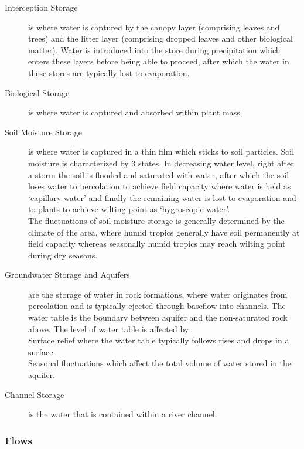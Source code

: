 \documentclass[../../main]{subfiles}
\begin{document}
	\begin{description}
		\item[Interception Storage] is where water is captured by the canopy layer (comprising leaves and trees) and the litter layer (comprising dropped leaves and other biological matter). Water is introduced into the store during precipitation which enters these layers before being able to proceed, after which the water in these stores are typically lost to evaporation.
		\item[Biological Storage] is where water is captured and absorbed within plant mass.
		\item[Soil Moisture Storage] is where water is captured in a thin film which sticks to soil particles. Soil moisture is characterized by 3 states. In decreasing water level, right after a storm the soil is flooded and saturated with water, after which the soil loses water to percolation to achieve field capacity where water is held as `capillary water' and finally the remaining water is lost to evaporation and to plants to achieve wilting point as `hygroscopic water'. \\
		The fluctuations of soil moisture storage is generally determined by the climate of the area, where humid tropics generally have soil permanently at field capacity whereas seasonally humid tropics may reach wilting point during dry seasons.
		\item[Groundwater Storage and Aquifers] are the storage of water in rock formations, where water originates from percolation and is typically ejected through baseflow into channels. The water table is the boundary between aquifer and the non-saturated rock above. The level of water table is affected by: \\
			Surface relief where the water table typically follows rises and drops in a surface. \\
			Seasonal fluctuations which affect the total volume of water stored in the aquifer.
		\item[Channel Storage] is the water that is contained within a river channel.
	\end{description}

\subsubsection{Flows}
\end{document}
